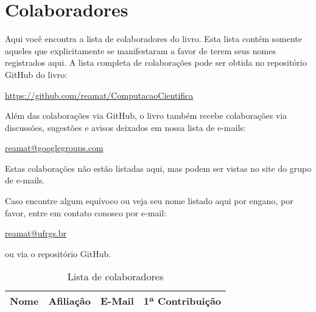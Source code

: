 
%
%
%

\chapter*{Colaboradores}
\fancyhead[LE,RO]{\thepage}

Aqui você encontra a lista de colaboradores do livro. Esta lista contém somente aqueles que explicitamente se manifestaram a favor de terem seus nomes registrados aqui. A lista completa de colaborações pode ser obtida no repositório GitHub do livro:
\begin{center}
  \url{https://github.com/reamat/ComputacaoCientifica}
\end{center}
Além das colaborações via GitHub, o livro também recebe colaborações via discussões, sugestões e avisos deixados em nossa lista de e-mails:
\begin{center}
\url{reamat@googlegroups.com}
\end{center}
Estas colaborações não estão listadas aqui, mas podem ser vistas no site do grupo de e-mails.

Caso encontre algum equívoco ou veja seu nome listado aqui por engano, por favor, entre em contato conosco por e-mail:
\begin{center}
  \url{reamat@ufrgs.br}
\end{center}
ou via o repositório GitHub.

\begin{table}[h!]
  \centering
  \caption{Lista de colaboradores}
  \label{tab:colaboradores}
  \begin{tabular}{llll} \hline
    Nome & Afiliação & E-Mail & 1ª Contribuição\\ \hline

    \hline
  \end{tabular}
\end{table}
